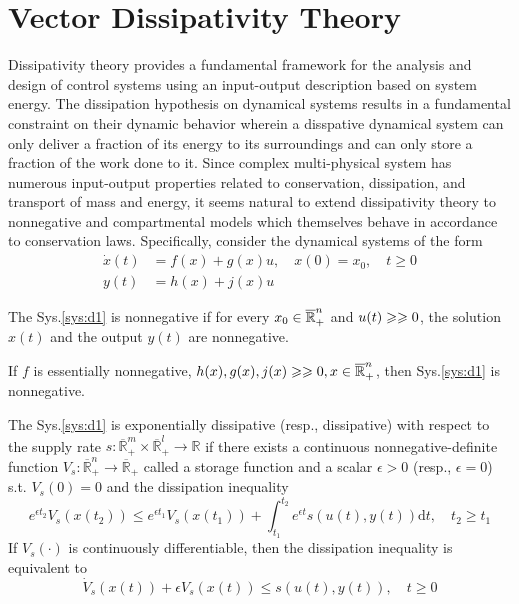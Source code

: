 \documentclass{paper}
\begin{document}
\section{Vector Dissipativity Theory}
Dissipativity theory provides a fundamental framework for the analysis and design of control systems using an input-output
description based on system energy. The dissipation hypothesis on dynamical systems results in a fundamental constraint
on their dynamic behavior wherein a disspative dynamical system can only deliver a fraction of its energy to its surroundings 
and can only store a fraction of the work done to it. Since complex multi-physical system has numerous input-output 
properties related to conservation, dissipation, and transport of mass and energy, it seems natural to extend dissipativity 
theory to nonnegative and compartmental models which themselves behave in accordance to conservation laws. Specifically, 
consider the dynamical systems of the form
\begin{align}\label{sys:d1} 
\dot{x}(t)&=f(x)+g(x)u, \quad x(0)=x_0, \quad t\geqslant 0 \\
y(t)&=h(x)+j(x)u \nonumber
\end{align}
\begin{defi}
The Sys.\ref{sys:d1} is nonnegative if for every $x_0\in\overline{\mathbb{R}}_{+}^{n}$ and $u(t)\geqslant\geqslant 0$, the solution $x(t)$ and the output $y(t)$ are
nonnegative.
\end{defi}
\begin{prop}
If $f$ is essentially nonnegative, $h(x),g(x),j(x)\geqslant\geqslant 0, x\in \overline{\mathbb{R}}_{+}^{n}$, then Sys.\ref{sys:d1} is nonnegative.
\end{prop}
\begin{defi}
The Sys.\ref{sys:d1} is exponentially dissipative (resp., dissipative) with respect to the supply rate $s:\overline{\mathbb{R}}_{+}^{m}
\times\overline{\mathbb{R}}_{+}^{l}\rightarrow \mathbb{R}$ if there exists a continuous nonnegative-definite function 
$V_s:\overline{\mathbb{R}}_{+}^{n}\rightarrow \overline{\mathbb{R}}_{+}$ called a storage function and a scalar $\epsilon>0$
(resp., $\epsilon=0$) s.t. $V_s(0)=0$ and the dissipation inequality
\begin{equation}
e^{\epsilon t_2}V_s(x(t_2))\leqslant e^{\epsilon t_1}V_s(x(t_1)) + \int_{t_1}^{t_2}e^{\epsilon t}s(u(t),y(t))\text{d}t, \quad t_2\geqslant t_1
\end{equation}
If $V_s(\cdot)$ is continuously differentiable, then the dissipation inequality is equivalent to 
\begin{equation}
\dot{V}_s(x(t))+\epsilon V_s(x(t))\leqslant s(u(t),y(t)), \quad t\geqslant 0
\end{equation}
\end{defi}
\end{document}

